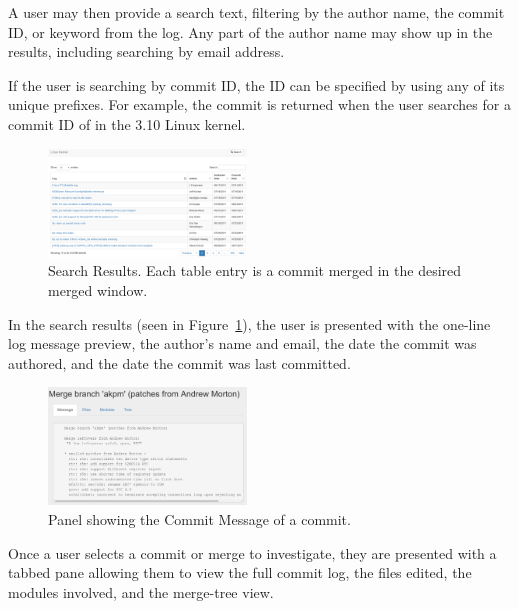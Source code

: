 \documentclass[conference, draftclsnofoot, draft]{IEEEtran}
\begin{document}
A user may then provide a search text, filtering by the author name, the commit ID,
or keyword from the log. Any part of the author name may show up in the results,
including searching by email address.

If the user is searching by commit ID, the ID can be specified by using any of its unique prefixes. For example, the commit
 is returned when the user searches for a
commit ID of  in the 3.10 Linux kernel. %

\begin{figure}
        \centering
        \includegraphics[width=0.47\textwidth]{figures/search_results_2.png}
        \caption{Search Results. Each table entry is a commit merged in the desired
                merged window.}
        \label{fig:results}
\end{figure}

In the search results (seen in Figure~\ref{fig:results}), the user is presented with the one-line log message preview,
the author's name and email, the date the commit was authored, and the date the commit was last committed.

\begin{figure}
        \centering
        \includegraphics[width=0.47\textwidth]{figures/log_view.png}
        \caption{Panel showing the Commit Message of a commit.}
        \label{fig:message}
\end{figure}

Once a user selects a commit or merge to investigate, they are presented with a
tabbed pane allowing them to view the full commit log, the files edited, the modules
involved, and the merge-tree view.
\end{document}
